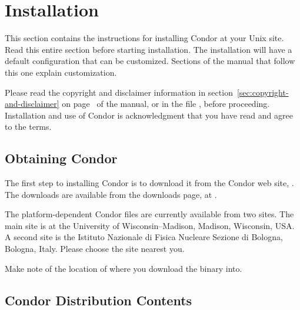 \section{\label{sec:install}Installation}

This section contains the instructions for installing Condor at your
Unix site.
Read this entire section before starting installation.
The installation will have a default configuration that can
be customized.
Sections of the manual that follow this one explain customization.

Please read the copyright and disclaimer information in 
section~\ref{sec:copyright-and-disclaimer} on
page~\pageref{sec:copyright-and-disclaimer} of the manual, or in the
file , before proceeding.  Installation and
use of Condor is acknowledgment that you have read and agree to the
terms.

\subsection{\label{sec:pre-install-procedure}
Obtaining Condor}
The first step to installing Condor is to download it from the Condor
web site, .
The downloads are available from the downloads page,
at .

The platform-dependent Condor files are currently available from two sites.
The main site is at the University of Wisconsin--Madison,
Madison, Wisconsin, USA.
A second site is the Istituto Nazionale di Fisica Nucleare Sezione di
Bologna, Bologna, Italy.
Please choose the site nearest you.

Make note of the location of where you download the binary into.

\subsection{\label{sec:install-contents}
Condor Distribution Contents}


